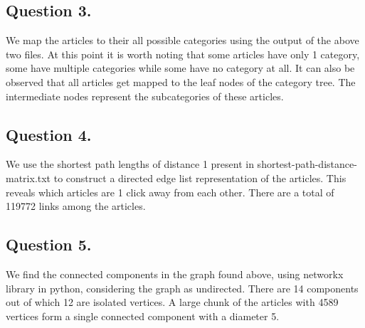 \documentclass{article}
\begin{document}
\subsection{Question 3.}
We map the articles to their all possible categories using the output of the above two files. At this point it is worth noting that some articles have only 1 category, some have multiple categories while some have no category at all. It can also be observed that all articles get mapped to the leaf nodes of the category tree. The intermediate nodes represent the subcategories of these articles.
\subsection{Question 4.}
We use the shortest path lengths of distance 1 present in shortest-path-distance-matrix.txt to construct a directed edge list representation of the articles. This reveals which articles are 1 click away from each other. There are a total of 119772 links among the articles.
\subsection{Question 5.}
We find the connected components in the graph found above, using networkx library in python, considering the graph as undirected. There are 14 components out of which 12 are isolated vertices. A large chunk of the articles with 4589 vertices form a single connected component with a diameter 5.
\end{document}
